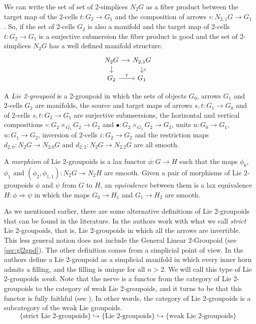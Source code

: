 We can write the set of set of 2-simplices $N_2G$ as a fiber product between the target map of the 2-cells $t\colon G_2\to G_1$ and the composition of arrows $\circ\colon N_{2,1}G\to G_1$.
So, if the set of 2-cells $G_2$ is also a manifold and the target map of 2-cells $t\colon G_2\to G_1$ is a surjective submersion the fiber product  is good and the set of 2-simplices $N_2G$ has a well defined manifold structure.
\begin{equation}
  \begin{tikzcd}[sep = small]
    N_2G \ar{r} \ar{d} & N_{2,1}G \ar{d}{\circ} \\
    G_2 \ar{r}{t} & G_1
  \end{tikzcd}
\end{equation}

A \emph{Lie 2-groupoid} is a 2-groupoid in which the sets of objects $G_0$, arrows $G_1$ and 2-cells $G_2$ are manifolds, the source and target maps of arrows $s,t\colon G_1\to G_0$ and of 2-cells $s,t\colon G_2\to G_1$ are surjective submsersions, the horizontal and vertical compositions $\circ\colon G_2\times_{G_1} G_2\to G_2$ and $\bullet\colon G_2\times_{G_1} G_2\to G_2$, units $u\colon G_0\to G_1$, $u\colon G_1\to G_2$, inversion of 2-cells $i\colon G_2\to G_2$ and the restriction maps $d_{2,0}\colon N_2G\to N_{2.0}G$ and $d_{2,2}\colon N_2G\to N_{2.2}G$ are all smooth.

A \emph{morphism} of Lie 2-groupoids is a lax functor $\phi\colon G\to H$ such that the maps $\phi_0$, $\phi_1$ and $(\phi_2,\phi_{1,1})\colon N_2G\to N_2H$ are smooth.
Given a pair of morphisms of Lie 2-groupoids $\phi$ and $\psi$ from $G$ to $H$, an \emph{equivalence} between them is a lax equivalence $H\colon\phi\Rightarrow\psi$ in which the maps $G_0\to H_1$ and $G_1\to H_2$ are smooth.


As we mentioned earlier, there are some alternative definitions of Lie 2-groupoids that can be found in the literature.
In \cite{gs15} the authors work with what we call \emph{strict} Lie 2-groupoids, that is, Lie 2-groupoids in which all the arrows are invertible.
This less general notion does not include the General Linear 2-Groupoid (see \textsection \ref{sec:gl2gpd}).
The other definition comes from a simplicial point of view.
In \cite{zhu09} the authors define a Lie 2-groupoid as a simplicial manifold in which every inner horn admits a filling, and the filling is unique for all $n>2$.
We will call this type of Lie 2-groupoids \emph{weak}.
Note that the nerve is a functor from the category of Lie 2-groupoids to the category of weak Lie 2-groupoids, and it turns to be that this functor is fully faithful (see \cite[Prop.\ 3.3]{dho20}).
In other words, the category of Lie 2-groupoids is a subcategory of the weak Lie groupoids.
\begin{equation}
\{ \text{strict Lie 2-groupoids} \} \hookrightarrow \{ \text{Lie 2-groupoids} \} \hookrightarrow \{ \text{weak Lie 2-groupoids} \}
\end{equation}
